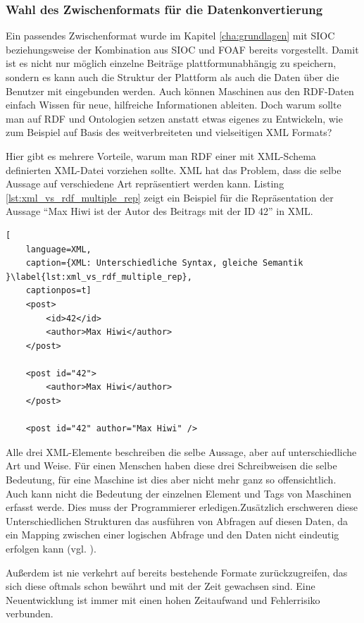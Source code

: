 \subsubsection{Wahl des Zwischenformats für die Datenkonvertierung} %
\label{ssub:wahl_des_zwischenformats_für_die_datenkonvertierung}

Ein passendes Zwischenformat wurde im Kapitel \ref{cha:grundlagen} mit SIOC beziehungsweise der Kombination aus SIOC und FOAF bereits vorgestellt. Damit ist es nicht nur möglich einzelne Beiträge plattformunabhängig zu speichern, sondern es kann auch die Struktur der Plattform als auch die Daten über die Benutzer mit eingebunden werden. Auch können Maschinen aus den RDF-Daten einfach Wissen für neue, hilfreiche Informationen ableiten. Doch warum sollte man auf RDF und Ontologien setzen anstatt etwas eigenes zu Entwickeln, wie zum Beispiel auf Basis des weitverbreiteten und vielseitigen XML Formats?

Hier gibt es mehrere Vorteile, warum man RDF einer mit XML-Schema definierten XML-Datei vorziehen sollte. XML hat das Problem, dass die selbe Aussage auf verschiedene Art repräsentiert werden kann. Listing \ref{lst:xml_vs_rdf_multiple_rep} zeigt ein Beispiel für die Repräsentation der Aussage \enquote{Max Hiwi ist der Autor des Beitrags mit der ID 42} in XML.

\begin{lstlisting}[
    language=XML,
    caption={XML: Unterschiedliche Syntax, gleiche Semantik }\label{lst:xml_vs_rdf_multiple_rep},
    captionpos=t]
    <post>
        <id>42</id>
        <author>Max Hiwi</author>
    </post>

    <post id="42">
        <author>Max Hiwi</author>
    </post>

    <post id="42" author="Max Hiwi" />
\end{lstlisting}

Alle drei XML-Elemente beschreiben die selbe Aussage, aber auf unterschiedliche Art und Weise. Für einen Menschen haben diese drei Schreibweisen die selbe Bedeutung, für eine Maschine ist dies aber nicht mehr ganz so offensichtlich. Auch kann nicht die Bedeutung der einzelnen Element und Tags von Maschinen erfasst werde. Dies muss der Programmierer erledigen.Zusätzlich erschweren diese Unterschiedlichen Strukturen das ausführen von Abfragen auf diesen Daten, da ein Mapping zwischen einer logischen Abfrage und den Daten nicht eindeutig erfolgen kann (vgl. \cite[S.\,41]{Schroder2003a}).

Außerdem ist nie verkehrt auf bereits bestehende Formate zurückzugreifen, das sich diese oftmals schon bewährt und mit der Zeit gewachsen sind. Eine Neuentwicklung ist immer mit einen hohen Zeitaufwand und Fehlerrisiko verbunden.

